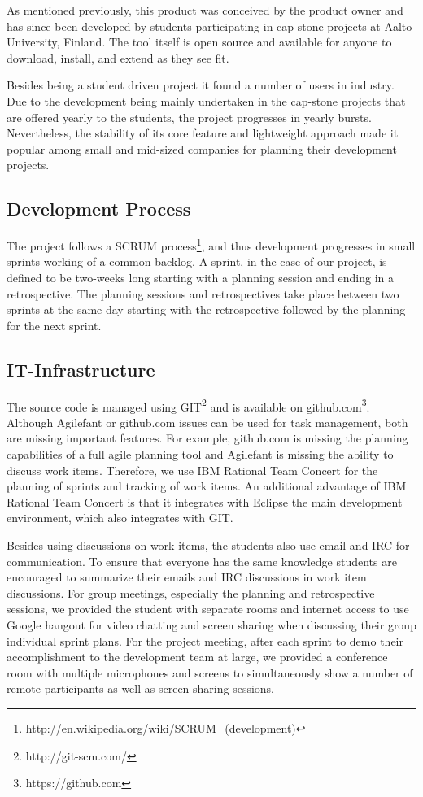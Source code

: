 As mentioned previously, this product was conceived by the product owner and has since been developed by students participating in cap-stone projects at Aalto University, Finland.
The tool itself is open source and available for anyone to download, install, and extend as they see fit.

Besides being a student driven project it found a number of users in industry.
Due to the development being mainly undertaken in the cap-stone projects that are offered yearly to the students, the project progresses in yearly bursts.
Nevertheless, the stability of its core feature and lightweight approach made it popular among small and mid-sized companies for planning their development projects.

\subsection{Development Process}
The project follows a SCRUM process\footnote{http://en.wikipedia.org/wiki/SCRUM\_(development)}, and thus development progresses in small sprints working of a common backlog.
A sprint, in the case of our project, is defined to be two-weeks long starting with a planning session and ending in a retrospective.
The planning sessions and retrospectives take place between two sprints at the same day starting with the retrospective followed by the planning for the next sprint.

\vspace{-5pt}
\subsection{IT-Infrastructure}
\vspace{-5pt}
The source code is managed using GIT\footnote{http://git-scm.com/} and is available on github.com\footnote{https://github.com}.
Although Agilefant or github.com issues can be used for task management, both are missing important features. 
For example, github.com is missing the planning capabilities of a full agile planning tool and Agilefant is missing the ability to discuss work items.
Therefore, we use IBM Rational Team Concert for the planning of sprints and tracking of work items.
An additional advantage of IBM Rational Team Concert is that  it integrates with Eclipse the main development environment, which also integrates with GIT. 

Besides using discussions on work items, the students also use email and IRC for communication.
To ensure that everyone has the same knowledge students are encouraged to summarize their emails and IRC discussions in work item discussions.
For group meetings, especially the planning and retrospective sessions, we provided the student with separate rooms and internet access to use Google hangout for video chatting and screen sharing when discussing their group individual sprint plans.
For the project meeting, after each sprint to demo their accomplishment to the development team at large, we provided a conference room with multiple microphones and screens to simultaneously show a number of remote participants as well as screen sharing sessions. 

